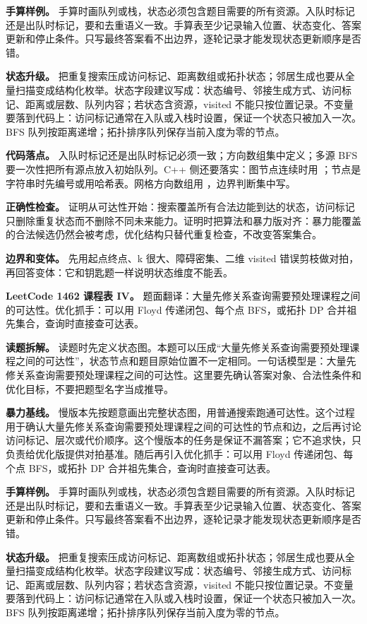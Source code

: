 \textbf{手算样例。} 手算时画队列或栈，状态必须包含题目需要的所有资源。入队时标记还是出队时标记，要和去重语义一致。手算表至少记录输入位置、状态变化、答案更新和停止条件。只写最终答案看不出边界，逐轮记录才能发现状态更新顺序是否错。

\textbf{状态升级。} 把重复搜索压成访问标记、距离数组或拓扑状态；邻居生成也要从全量扫描变成结构化枚举。状态字段建议写成：状态编号、邻接生成方式、访问标记、距离或层数、队列内容；若状态含资源，visited 不能只按位置记录。不变量要落到代码上：访问标记通常在入队或入栈时设置，保证一个状态只被加入一次。BFS 队列按距离递增；拓扑排序队列保存当前入度为零的节点。

\textbf{代码落点。} 入队时标记还是出队时标记必须一致；方向数组集中定义；多源 BFS 要一次性把所有源点放入初始队列。C++ 侧还要落实：图节点连续时用 ；节点是字符串时先编号或用哈希表。网格方向数组用 ，边界判断集中写。

\textbf{正确性检查。} 证明从可达性开始：搜索覆盖所有合法边能到达的状态，访问标记只删除重复状态而不删除不同未来能力。证明时把算法和暴力版对齐：暴力能覆盖的合法候选仍然会被考虑，优化结构只替代重复检查，不改变答案集合。

\textbf{边界和变体。} 先用起点终点、k 很大、障碍密集、二维 visited 错误剪枝做对拍，再回答变体：它和钥匙题一样说明状态维度不能丢。

\noindent\textbf{LeetCode 1462 课程表 IV。} 题面翻译：大量先修关系查询需要预处理课程之间的可达性。优化抓手：可以用 Floyd 传递闭包、每个点 BFS，或拓扑 DP 合并祖先集合，查询时直接查可达表。

\textbf{读题拆解。} 读题时先定义状态图。本题可以压成“大量先修关系查询需要预处理课程之间的可达性”，状态节点和题目原始位置不一定相同。一句话模型是：大量先修关系查询需要预处理课程之间的可达性。这里要先确认答案对象、合法性条件和优化目标，不要把题型名字当成推导。

\textbf{暴力基线。} 慢版本先按题意画出完整状态图，用普通搜索跑通可达性。这个过程用于确认大量先修关系查询需要预处理课程之间的可达性的节点和边，之后再讨论访问标记、层次或代价顺序。这个慢版本的任务是保证不漏答案；它不追求快，只负责给优化版提供对拍基准。随后再引入优化抓手：可以用 Floyd 传递闭包、每个点 BFS，或拓扑 DP 合并祖先集合，查询时直接查可达表。

\textbf{手算样例。} 手算时画队列或栈，状态必须包含题目需要的所有资源。入队时标记还是出队时标记，要和去重语义一致。手算表至少记录输入位置、状态变化、答案更新和停止条件。只写最终答案看不出边界，逐轮记录才能发现状态更新顺序是否错。

\textbf{状态升级。} 把重复搜索压成访问标记、距离数组或拓扑状态；邻居生成也要从全量扫描变成结构化枚举。状态字段建议写成：状态编号、邻接生成方式、访问标记、距离或层数、队列内容；若状态含资源，visited 不能只按位置记录。不变量要落到代码上：访问标记通常在入队或入栈时设置，保证一个状态只被加入一次。BFS 队列按距离递增；拓扑排序队列保存当前入度为零的节点。


